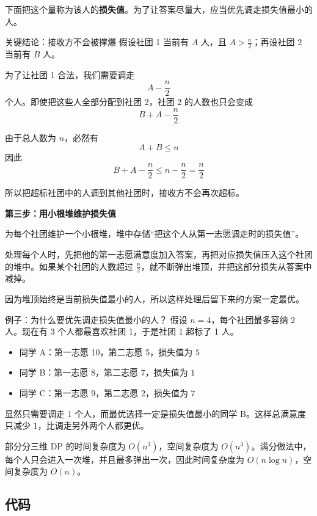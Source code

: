 \documentclass{book}
\begin{document}
下面把这个量称为该人的\textbf{损失值}。为了让答案尽量大，应当优先调走损失值最小的人。

\begin{keybox}{关键结论：接收方不会被撑爆}
假设社团 1 当前有 $A$ 人，且 $A > \frac{n}{2}$；再设社团 2 当前有 $B$ 人。

为了让社团 1 合法，我们需要调走
\[
A - \frac{n}{2}
\]
个人。即使把这些人全部分配到社团 2，社团 2 的人数也只会变成
\[
B + A - \frac{n}{2}
\]

由于总人数为 $n$，必然有
\[
A + B \le n
\]
因此
\[
B + A - \frac{n}{2} \le n - \frac{n}{2} = \frac{n}{2}
\]

所以把超标社团中的人调到其他社团时，接收方不会再次超标。
\end{keybox}

\par\medskip
\noindent\textbf{第三步：用小根堆维护损失值}
\par\medskip
为每个社团维护一个小根堆，堆中存储“把这个人从第一志愿调走时的损失值”。

处理每个人时，先把他的第一志愿满意度加入答案，再把对应损失值压入这个社团的堆中。如果某个社团的人数超过 $\frac{n}{2}$，就不断弹出堆顶，并把这部分损失从答案中减掉。

因为堆顶始终是当前损失值最小的人，所以这样处理后留下来的方案一定最优。

\begin{examplebox}{例子：为什么要优先调走损失值最小的人？}
假设 $n=4$，每个社团最多容纳 2 人。现在有 3 个人都最喜欢社团 1，于是社团 1 超标了 1 人。

\begin{itemize}[leftmargin=2.2em,itemsep=2pt,topsep=2pt]
    \item 同学 A：第一志愿 10，第二志愿 5，损失值为 $5$
    \item 同学 B：第一志愿 8，第二志愿 7，损失值为 $1$
    \item 同学 C：第一志愿 9，第二志愿 2，损失值为 $7$
\end{itemize}

显然只需要调走 1 个人，而最优选择一定是损失值最小的同学 B。这样总满意度只减少 $1$，比调走另外两个人都更优。
\end{examplebox}

部分分三维 DP 的时间复杂度为 $O(n^3)$，空间复杂度为 $O(n^3)$。满分做法中，每个人只会进入一次堆，并且最多弹出一次，因此时间复杂度为 $O(n \log n)$，空间复杂度为 $O(n)$。

\subsection{代码}
\end{document}
